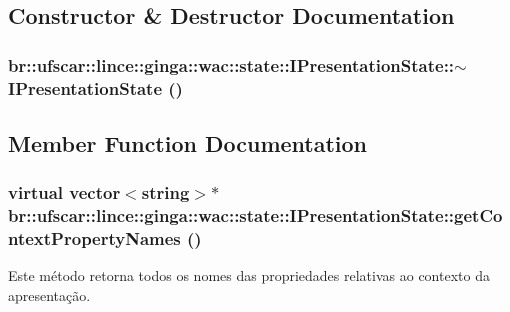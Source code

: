 \subsection{Constructor \& Destructor Documentation}
\hypertarget{classbr_1_1ufscar_1_1lince_1_1ginga_1_1wac_1_1state_1_1IPresentationState_a4e3e2eac0d45ddcf17526115f9a7ef84}{
\subsubsection[{$\sim$IPresentationState}]{\setlength{\rightskip}{0pt plus 5cm}br::ufscar::lince::ginga::wac::state::IPresentationState::$\sim$IPresentationState ()}}
\label{classbr_1_1ufscar_1_1lince_1_1ginga_1_1wac_1_1state_1_1IPresentationState_a4e3e2eac0d45ddcf17526115f9a7ef84}


\subsection{Member Function Documentation}
\hypertarget{classbr_1_1ufscar_1_1lince_1_1ginga_1_1wac_1_1state_1_1IPresentationState_a3ec5c1d54f31461e1a3e81a54fefaa87}{
\subsubsection[{getContextPropertyNames}]{\setlength{\rightskip}{0pt plus 5cm}virtual vector$<$string$>$$\ast$ br::ufscar::lince::ginga::wac::state::IPresentationState::getContextPropertyNames ()}}
\label{classbr_1_1ufscar_1_1lince_1_1ginga_1_1wac_1_1state_1_1IPresentationState_a3ec5c1d54f31461e1a3e81a54fefaa87}


Este método retorna todos os nomes das propriedades relativas ao contexto da apresentação. 


